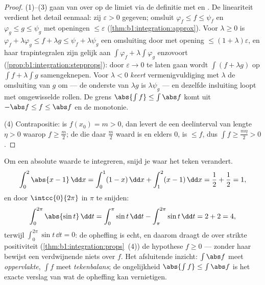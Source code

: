 \begin{proof}
(1)--(3) gaan van  over op de limiet via de definitie
met  en . De lineariteit verdient het detail
eenmaal: zij $\varepsilon > 0$ gegeven; omsluit $\varphi_f \leq f
\leq \psi_f$ en $\varphi_g \leq g \leq \psi_g$ met openingen
$\leq \varepsilon$ (\cref{thm:b1:integration:approx}). Voor
$\lambda \geq 0$ is $\varphi_f + \lambda\varphi_g \leq f +
\lambda g \leq \psi_f + \lambda\psi_g$ een omsluiting door
 met opening $\leq (1 + \lambda)\varepsilon$, en haar
trapintegralen zijn gelijk aan $\int \varphi_f +
\lambda\int\varphi_g$ enzovoort
(\cref{prop:b1:integration:stepprops}): door $\varepsilon \to 0$
te laten gaan wordt $\int(f + \lambda g)$ op $\int f +
\lambda\int g$ samengeknepen. Voor $\lambda < 0$ \emph{keert}
vermenigvuldiging met $\lambda$ de omsluiting van $g$ om --- de
onderste  van $\lambda g$ is $\lambda \psi_g$ --- en
dezelfde insluiting loopt met omgewisselde rollen. De grens
$\abs{\int f} \leq \int \abs f$ komt uit $-\abs f \leq f \leq
\abs f$ en de monotonie.

(4) Contrapositie: is $f(x_0) = m > 0$, dan levert de
 een deelinterval van lengte $\eta > 0$ waarop $f \geq
\frac m2$; de  die daar $\frac m2$ waard is en elders
$0$, is $\leq f$, dus $\int f \geq \frac{m\eta}{2} > 0$.
\end{proof}

\begin{example}\label{ex:b1:integration:chasleswork}
Om een absolute waarde te integreren, snijd je waar het teken
verandert.
\[
\int_0^2 \abs{x - 1}\,\dd x
= \int_0^1 (1 - x)\,\dd x + \int_1^2 (x - 1)\,\dd x
= \frac12 + \frac12 = 1 ,
\]
en door $\intcc{0}{2\pi}$ in $\pi$ te snijden:
\[
\int_0^{2\pi} \abs{\sin t}\,\dd t
= \int_0^{\pi} \sin t\,\dd t - \int_{\pi}^{2\pi} \sin t\,\dd t
= 2 + 2 = 4 ,
\]
terwijl $\int_0^{2\pi} \sin t\,\dd t = 0$: de opheffing is echt,
en daarom draagt de  over strikte positiviteit
(\cref{thm:b1:integration:props}~(4)) de hypothese $f \geq 0$ ---
zonder haar bewijst een verdwijnende  niets over $f$.
Het afsluitende inzicht: $\int \abs f$ meet \emph{oppervlakte},
$\int f$ meet \emph{tekenbalans}; de ongelijkheid $\abs{\int f}
\leq \int\abs f$ is het exacte verslag van wat de opheffing kan
vernietigen.
\end{example}

